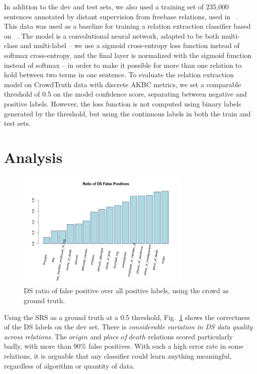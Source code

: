 In addition to the dev and test sets, we also used a training set of 235,000 sentences annotated by distant supervision from freebase relations, used in ~\cite{riedel2013universalschema}.  This data was used as a baseline for training a relation extraction classifier based on ~\cite{nguyen2015relation}.  The model is a convolutional neural network, adapted to be both multi-class and multi-label -- we use a sigmoid cross-entropy loss function instead of softmax cross-entropy, and the final layer is normalized with the sigmoid function instead of softmax -- in order to make it possible for more than one relation to hold between two terms in one sentence.
To evaluate the relation extraction model on CrowdTruth data with discrete AKBC metrics, we set a comparable threshold of 0.5 on the model confidence score, separating between negative and positive labels. However, the loss function is not computed using binary labels generated by the threshold, but using the continuous labels in both the train and test sets.

\section{Analysis}

\begin{figure}[htb!]
\centering
\includegraphics[width=0.75\textwidth]{img/fp_ratio.png}
\caption{DS ratio of false positive over all positive labels, using the crowd as ground truth.}
\label{fig:fp_rate}
\end{figure}

Using the SRS as a ground truth at a 0.5 threshold, Fig.~\ref{fig:fp_rate} shows the correctness of the DS labels on the dev set.  There is \textit{considerable variation in DS data quality across relations}. The $origin$ and $place\ of\ death$ relations scored particularly badly, with more than 90\% false positives. With such a high error rate in some relations, it is arguable that any classifier could learn anything meaningful, regardless of algorithm or quantity of data.

